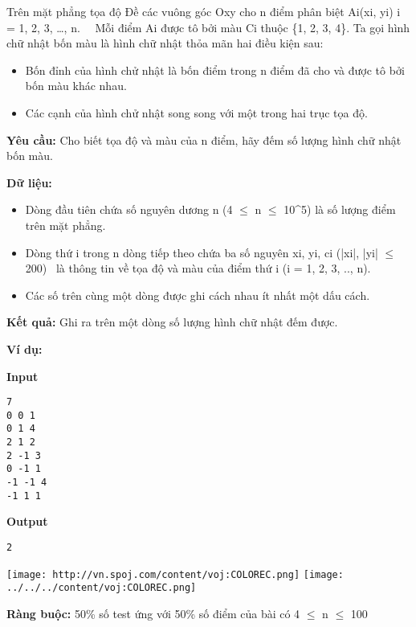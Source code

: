 

Trên mặt phẳng tọa độ Đề các vuông góc Oxy cho n điểm phân biệt Ai(xi, yi) i = 1, 2, 3, …, n.   Mỗi điểm Ai được tô bởi màu Ci thuộc \{1, 2, 3, 4\}. Ta gọi hình chữ nhật bốn màu là hình chữ nhật thỏa mãn hai điều kiện sau:
\begin{itemize}
	\item Bốn đỉnh của hình chử nhật là bốn điểm trong n điểm đã cho và được tô bởi bốn màu khác nhau.
	\item Các cạnh của hình chử nhật song song với một trong hai trục tọa độ.
\end{itemize}

\textbf{Yêu cầu: } Cho biết tọa độ và màu của n điểm, hãy đếm số lượng hình chữ nhật bốn màu.

\textbf{Dữ liệu: }
\begin{itemize}
	\item Dòng đầu tiên chứa số nguyên dương n (4  $\le$  n  $\le$  10\textasciicircum5) là số lượng điểm trên mặt phẳng.
	\item Dòng thứ i trong n dòng tiếp theo chứa ba số nguyên xi, yi, ci (|xi|, |yi|  $\le$  200)  là thông tin về tọa độ và màu của điểm thứ i (i = 1, 2, 3, .., n).
	\item Các số trên cùng một dòng được ghi cách nhau ít nhất một dấu cách.
\end{itemize}

\textbf{Kết quả: } Ghi ra trên một dòng số lượng hình chữ nhật đếm được.

\textbf{Ví dụ: }

\textbf{Input }
\begin{verbatim}
7
0 0 1
0 1 4
2 1 2
2 -1 3
0 -1 1
-1 -1 4
-1 1 1\end{verbatim}

\textbf{Output}
\begin{verbatim}
2\end{verbatim}


\texttt{[image: http://vn.spoj.com/content/voj:COLOREC.png]}
\texttt{[image: ../../../content/voj:COLOREC.png]}

\textbf{Ràng buộc: } 50\% số test ứng với 50\% số điểm của bài có 4  $\le$  n  $\le$  100
